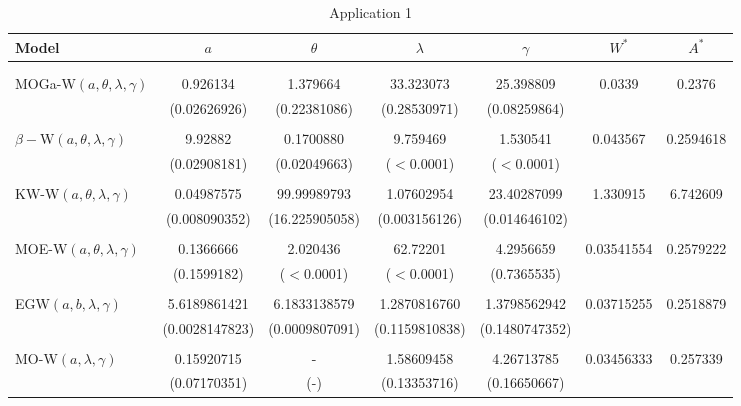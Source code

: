 \documentclass[twoside,leqno,11pt]{article}
\begin{document}
\begin{table}[!htb]
\scriptsize
\center
\caption{  \small Application 1}
\label{tab-ex1}
\begin{tabular}{lcccccc}
\hline\noalign{\smallskip}
Model & $a$ & $\theta$ & $\lambda$ & $\gamma$ &  $W^*$ & $A^*$   \\
\hline \\
 & & & & &  \\
MOGa-W$(a,\theta,\lambda,\gamma)$    &  0.926134 & 1.379664 & 33.323073 & 25.398809 & 0.0339 &  0.2376 \\                            &    (0.02626926) & (0.22381086) & (0.28530971) & (0.08259864)  & & \\

 & & & & &  \\
$\beta-$W$(a,\theta,\lambda,\gamma)$ &   9.92882 &  0.1700880 & 9.759469 & 1.530541  & 0.043567 & 0.2594618\\
                                    &    (0.02908181) & (0.02049663) & ($<$0.0001) & ($<$0.0001)  && \\
                                                                                & & & & &  \\
KW-W$(a,\theta,\lambda,\gamma)$ &    0.04987575 & 99.99989793 &  1.07602954 & 23.40287099 & 1.330915 & 6.742609\\
                                       &    (0.008090352) & (16.225905058) &  (0.003156126) &  (0.014646102) && \\																						 & & & & &  \\
                                       MOE-W$(a,\theta,\lambda,\gamma)$  &  0.1366666 & 2.020436 & 62.72201 & 4.2956659  &0.03541554 & 0.2579222 \\
 & (0.1599182) & ($<$0.0001) &($<$0.0001) & (0.7365535)    &  & \\
                                                                              & & & & &  \\
EGW$(a,b,\lambda,\gamma)$    &  5.6189861421 &  6.1833138579 &  1.2870816760  & 1.3798562942  &  0.03715255 & 0.2518879 \\
& (0.0028147823) & (0.0009807091) & (0.1159810838) & (0.1480747352)    &  & \\
                                                           & & & & &  \\                                                           MO-W$(a,\lambda,\gamma)$  & 0.15920715  & - &  1.58609458  & 4.26713785  &  0.03456333   & 0.257339\\
&    (0.07170351) & (-) & (0.13353716) & (0.16650667)  &  & \\


\end{tabular}
\end{table}
\end{document}
